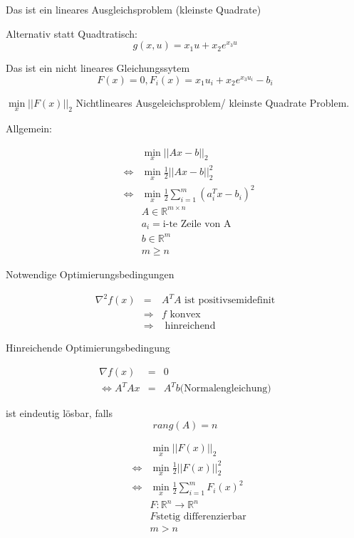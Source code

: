 \documentclass[10pt,a4paper]{article}
\begin{document}
Das ist ein lineares Ausgleichsproblem (kleinste Quadrate)

Alternativ statt Quadtratisch: $$g(x,u)=x_1u+x_2 e^{x_3 u}$$

Das ist ein nicht lineares Gleichungssytem $$F(x)=0, F_i(x)=x_1 u_i + x_2 e^{x_3 u_i} - b_i$$


$  \min\limits_{x} ||F(x)||_2$ Nichtlineares Ausgeleichsproblem/ kleinste Quadrate Problem.


Allgemein:

\begin{defi}

\begin{eqnarray*}
& & \min\limits_{x}  ||Ax-b||_2 \\
& \Leftrightarrow & \min\limits_{x} \frac{1}{2} ||Ax-b||^{2}_2 \\
& \Leftrightarrow & \min\limits_{x} \frac{1}{2} \sum_{i=1}^{m} (a_i^{T}x-b_i)^{2} \\
&& A \in  \mathbb{R}^{m \times n} \\
&& a_i = \text{i-te Zeile von A}\\
&& b \in  \mathbb{R}^{m} \\
&& m \geq  n
\end{eqnarray*}

Notwendige Optimierungsbedingungen

\begin{eqnarray*}
\nabla^{2} f(x)&=&A^{T}A \text{ ist positivsemidefinit} \\
&\Rightarrow & f \text{ konvex} \\
&\Rightarrow & \text{ hinreichend} 
\end{eqnarray*}

Hinreichende Optimierungsbedingung

\begin{eqnarray*}
\nabla f(x) &=& 0 \\
\Leftrightarrow A^{T}Ax&=&A^{T}b \text{(Normalengleichung)} 
\end{eqnarray*}

ist eindeutig lösbar, falls $$rang(A)=n$$

\end{defi}


\begin{defi}

\begin{eqnarray*}
&&\min\limits_{x} ||F(x)||_2 \\
&\Leftrightarrow & \min\limits_{x} \frac{1}{2} ||F(x)||_2^{2}  \\
&\Leftrightarrow & \min\limits_{x} \frac{1}{2} \sum_{i=1}^{m} F_i(x)^{2}\\
&& F: \mathbb{R}^{n} \rightarrow \mathbb{R}^{n} \\
&& F \text{stetig differenzierbar}\\
&& m > n
\end{eqnarray*}

\end{defi}
\end{document}

